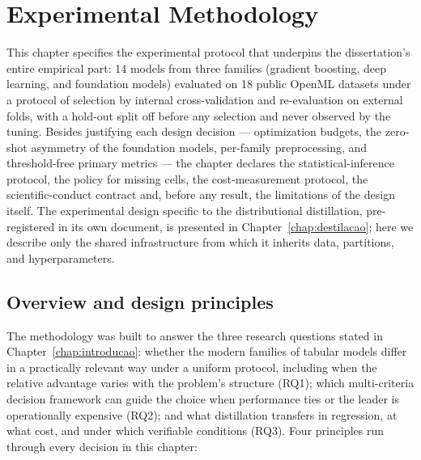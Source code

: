 \chapter{Experimental Methodology}
\label{chap:metodologia}

This chapter specifies the experimental protocol that underpins the
dissertation's entire empirical part: 14 models from three families
(gradient boosting, deep learning, and foundation models) evaluated on
18 public OpenML datasets under a protocol of selection by internal
cross-validation and re-evaluation on external folds, with a hold-out
split off before any selection and never observed by the tuning.
Besides justifying each design decision --- optimization budgets, the
zero-shot asymmetry of the foundation models, per-family
preprocessing, and threshold-free primary metrics --- the chapter
declares the statistical-inference protocol, the policy for missing
cells, the cost-measurement protocol, the scientific-conduct contract
and, before any result, the limitations of the design itself. The
experimental design specific to the distributional distillation,
pre-registered in its own document, is presented in
Chapter~\ref{chap:destilacao}; here we describe only the shared
infrastructure from which it inherits data, partitions, and
hyperparameters.

\section{Overview and design principles}
\label{sec:met-visao}

The methodology was built to answer the three research questions
stated in Chapter~\ref{chap:introducao}: whether the modern families
of tabular models differ in a practically relevant way under a
uniform protocol, including when the relative advantage varies with
the problem's structure (RQ1); which multi-criteria decision
framework can guide the choice when performance ties or the leader is
operationally expensive (RQ2); and what distillation transfers in
regression, at what cost, and under which verifiable conditions
(RQ3). Four principles run through every decision in this chapter:

